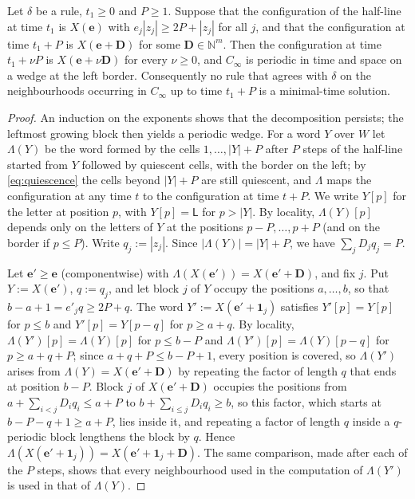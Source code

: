 \begin{lemma}\label{lem:certificate}
Let $\delta$ be a rule, $t_1\ge0$ and $P\ge1$. Suppose that the
configuration of the half-line at time $t_1$ is $X(\mathbf e)$ with
$e_j|z_j|\ge2P+|z_j|$ for all $j$, and that the configuration at time
$t_1+P$ is $X(\mathbf e+\mathbf D)$ for some $\mathbf D\in\mathbb N^m$. Then
the configuration at time $t_1+\nu P$ is $X(\mathbf e+\nu\mathbf D)$ for
every $\nu\ge0$, and $C_\infty$ is periodic in time and space on a wedge at
the left border. Consequently no rule that agrees with $\delta$ on the
neighbourhoods occurring in $C_\infty$ up to time $t_1+P$ is a minimal-time
solution.
\end{lemma}

\begin{proof}
An induction on the exponents shows that the decomposition persists; the
leftmost growing block then yields a periodic wedge. For a word $Y$ over $W$
let $\Lambda(Y)$ be the word formed by the cells
$1,\dots,|Y|+P$ after $P$ steps of the half-line started from $Y$ followed
by quiescent cells, with the border on the left; by \eqref{eq:quiescence}
the cells beyond $|Y|+P$ are still quiescent, and $\Lambda$ maps the
configuration at any time $t$ to the configuration at time $t+P$. We write
$Y[p]$ for the letter at position $p$, with $Y[p]=\mathsf L$ for $p>|Y|$. By
locality, $\Lambda(Y)[p]$ depends only on the letters of $Y$ at the positions
$p-P,\dots,p+P$ (and on the border if $p\le P$). Write $q_j:=|z_j|$. Since
$|\Lambda(Y)|=|Y|+P$, we have $\sum_jD_jq_j=P$.

Let $\mathbf e'\ge\mathbf e$ (componentwise) with
$\Lambda(X(\mathbf e'))=X(\mathbf e'+\mathbf D)$, and fix $j$. Put
$Y:=X(\mathbf e')$, $q:=q_j$, and let block $j$ of $Y$ occupy the positions
$a,\dots,b$, so that $b-a+1=e'_jq\ge2P+q$. The word
$Y':=X(\mathbf e'+\mathbf 1_j)$ satisfies $Y'[p]=Y[p]$ for $p\le b$ and
$Y'[p]=Y[p-q]$ for $p\ge a+q$. By locality, $\Lambda(Y')[p]=\Lambda(Y)[p]$ for
$p\le b-P$ and $\Lambda(Y')[p]=\Lambda(Y)[p-q]$ for $p\ge a+q+P$; since
$a+q+P\le b-P+1$, every position is covered, so $\Lambda(Y')$ arises from
$\Lambda(Y)=X(\mathbf e'+\mathbf D)$ by repeating the factor of length $q$ that
ends at position $b-P$. Block $j$ of $X(\mathbf e'+\mathbf D)$ occupies the
positions from $a+\sum_{i<j}D_iq_i\le a+P$ to $b+\sum_{i\le j}D_iq_i\ge b$,
so this factor, which starts at $b-P-q+1\ge a+P$, lies inside it, and
repeating a factor of length $q$ inside a $q$-periodic block lengthens the
block by $q$. Hence $\Lambda(X(\mathbf e'+\mathbf 1_j))=X(\mathbf e'+\mathbf
1_j+\mathbf D)$. The same comparison, made after each of the $P$ steps,
shows that every neighbourhood used in the computation of $\Lambda(Y')$ is used
in that of $\Lambda(Y)$.


\end{proof}
